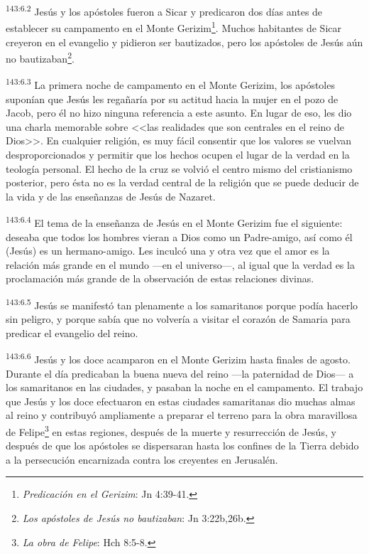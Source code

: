\par 
\textsuperscript{143:6.2} Jesús y los apóstoles fueron a Sicar y predicaron dos días antes de establecer su campamento en el Monte Gerizim\footnote{\textit{Predicación en el Gerizim}: Jn 4:39-41.}. Muchos habitantes de Sicar creyeron en el evangelio y pidieron ser bautizados, pero los apóstoles de Jesús aún no bautizaban\footnote{\textit{Los apóstoles de Jesús no bautizaban}: Jn 3:22b,26b.}.

\par 
\textsuperscript{143:6.3} La primera noche de campamento en el Monte Gerizim, los apóstoles suponían que Jesús les regañaría por su actitud hacia la mujer en el pozo de Jacob, pero él no hizo ninguna referencia a este asunto. En lugar de eso, les dio una charla memorable sobre <<las realidades que son centrales en el reino de Dios>>. En cualquier religión, es muy fácil consentir que los valores se vuelvan desproporcionados y permitir que los hechos ocupen el lugar de la verdad en la teología personal. El hecho de la cruz se volvió el centro mismo del cristianismo posterior, pero ésta no es la verdad central de la religión que se puede deducir de la vida y de las enseñanzas de Jesús de Nazaret.

\par 
\textsuperscript{143:6.4} El tema de la enseñanza de Jesús en el Monte Gerizim fue el siguiente: deseaba que todos los hombres vieran a Dios como un Padre-amigo, así como él (Jesús) es un hermano-amigo. Les inculcó una y otra vez que el amor es la relación más grande en el mundo ---en el universo---, al igual que la verdad es la proclamación más grande de la observación de estas relaciones divinas.

\par 
\textsuperscript{143:6.5} Jesús se manifestó tan plenamente a los samaritanos porque podía hacerlo sin peligro, y porque sabía que no volvería a visitar el corazón de Samaria para predicar el evangelio del reino.

\par 
\textsuperscript{143:6.6} Jesús y los doce acamparon en el Monte Gerizim hasta finales de agosto. Durante el día predicaban la buena nueva del reino ---la paternidad de Dios--- a los samaritanos en las ciudades, y pasaban la noche en el campamento. El trabajo que Jesús y los doce efectuaron en estas ciudades samaritanas dio muchas almas al reino y contribuyó ampliamente a preparar el terreno para la obra maravillosa de Felipe\footnote{\textit{La obra de Felipe}: Hch 8:5-8.} en estas regiones, después de la muerte y resurrección de Jesús, y después de que los apóstoles se dispersaran hasta los confines de la Tierra debido a la persecución encarnizada contra los creyentes en Jerusalén.

